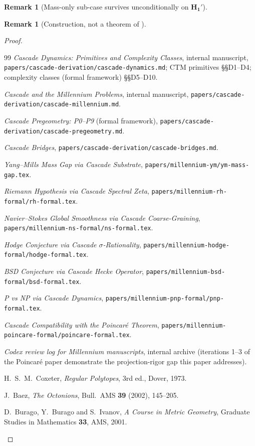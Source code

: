 \documentclass[11pt, a4paper]{amsart}
\theoremstyle{definition}
\newtheorem{remark}[theorem]{Remark}
\begin{document}
\begin{remark}[Mass-only sub-case survives unconditionally on $\mathbf{H_1'}$]
\begin{remark}[Construction, not a theorem of \cite{CascadeEmbeddings}]
\begin{proof}
\begin{thebibliography}{99}
\emph{Cascade Dynamics: Primitives and Complexity Classes},
  internal manuscript,
  \texttt{papers/cascade-derivation/cascade-dynamics.md}; CTM
  primitives \S\S D1--D4; complexity classes (formal framework)
  \S\S D5--D10.

\emph{Cascade and the Millennium Problems}, internal manuscript,
  \texttt{papers/cascade-derivation/cascade-millennium.md}.

\emph{Cascade Pregeometry: P0--P9} (formal framework),
  \texttt{papers/cascade-derivation/cascade-pregeometry.md}.

\emph{Cascade Bridges},
  \texttt{papers/cascade-derivation/cascade-bridges.md}.

\emph{Yang--Mills Mass Gap via Cascade Substrate},
  \texttt{papers/millennium-ym/ym-mass-gap.tex}.

\emph{Riemann Hypothesis via Cascade Spectral Zeta},
  \texttt{papers/millennium-rh-formal/rh-formal.tex}.

\emph{Navier--Stokes Global Smoothness via Cascade Coarse-Graining},
  \texttt{papers/millennium-ns-formal/ns-formal.tex}.

\emph{Hodge Conjecture via Cascade $\sigma$-Rationality},
  \texttt{papers/millennium-hodge-formal/hodge-formal.tex}.

\emph{BSD Conjecture via Cascade Hecke Operator},
  \texttt{papers/millennium-bsd-formal/bsd-formal.tex}.

\emph{P vs NP via Cascade Dynamics},
  \texttt{papers/millennium-pnp-formal/pnp-formal.tex}.

\emph{Cascade Compatibility with the Poincar\'e Theorem},
  \texttt{papers/millennium-poincare-formal/poincare-formal.tex}.

\emph{Codex review log for Millennium manuscripts}, internal
  archive (iterations 1--3 of the Poincar\'e paper demonstrate
  the projection-rigor gap this paper addresses).

H.~S.~M.~Coxeter, \emph{Regular Polytopes}, 3rd ed., Dover, 1973.

J.~Baez, \emph{The Octonions}, Bull.\ AMS \textbf{39} (2002),
  145--205.

D.~Burago, Y.~Burago and S.~Ivanov, \emph{A Course in Metric
  Geometry}, Graduate Studies in Mathematics \textbf{33}, AMS, 2001.


\end{thebibliography}
\end{proof}
\end{remark}
\end{remark}
\end{document}
